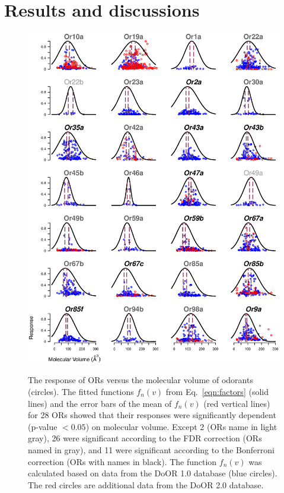 \documentclass[fleqn,11pt]{wlscirep}
\newcommand{\numberofreceptors}{ 28 }
\newcommand{\bonferroni}{ 11 }
\newcommand{\fdr}{ 26 }
\newcommand{\nocorrection}{ 2 }
\begin{document}
\section*{Results and discussions}
\begin{figure}
	\centering
		\includegraphics[width= 0.9 \textwidth]{vol-res-}
		\label{fig:vol-res:all}		
	\caption{The response of ORs versus the molecular volume of odorants (circles).  
			The fitted functions $f_n(v)$ from Eq.~\ref{eqn:factors} (solid lines) 
			and the error bars of the mean of $f_n(v)$ (red vertical lines) 
			for \numberofreceptors ORs showed that their responses were significantly dependent (p-value $<0.05$) on molecular volume. 
			Except \nocorrection (ORs name in light gray), \fdr were significant according to the FDR correction (ORs named in gray), and
			\bonferroni were significant according to the Bonferroni correction (ORs with names in black).
			The function $f_n(v)$ was calculated based on data from the DoOR 1.0 database (blue circles). 
			The red circles are additional data from the DoOR 2.0 database. 
		}
	\label{fig:vol-res}
\end{figure}
\end{document}
